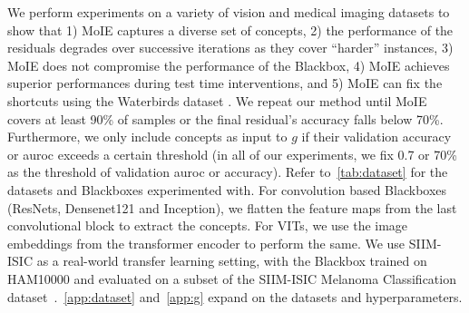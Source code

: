 
We perform experiments on a variety of vision and medical imaging datasets to show that 1) MoIE captures a diverse set of concepts, 2) the performance of the residuals degrades over successive iterations as they cover ``harder'' instances, 3) MoIE does not compromise the performance of the Blackbox, 4) MoIE achieves superior performances during test time interventions, and 5) MoIE can fix the shortcuts using the Waterbirds dataset \cite{sagawa2019dro}. We repeat our method until MoIE covers at least 90\% of samples or the final residual's accuracy falls below 70\%. Furthermore, we only include concepts as
input to $g$ if their validation accuracy or auroc exceeds a certain threshold (in all of our experiments,
we fix 0.7 or 70\% as the threshold of validation auroc or accuracy). Refer to~\cref{tab:dataset} for the datasets and Blackboxes experimented with. For convolution based Blackboxes (ResNets, Densenet121 and Inception), we flatten the feature maps from the last convolutional block to extract the concepts. For VITs, we use the image embeddings from the transformer encoder to perform the same. We use SIIM-ISIC as a real-world transfer learning setting, with the Blackbox trained on HAM10000 and evaluated on a subset of the SIIM-ISIC Melanoma Classification dataset~\cite{yuksekgonul2022post}.~\cref{app:dataset} and~\cref{app:g} expand on the datasets and hyperparameters.

